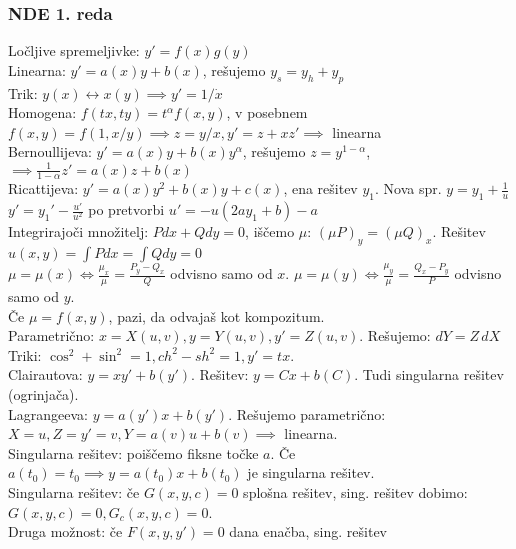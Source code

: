 \documentclass[a4paper,10pt]{article}
\title{\mytitle}
\author{Jure Slak}
\date{\today}
\theoremstyle{definition}
\let\oldint\int
\renewcommand{\int}{\oldint \!}
\begin{document}
\subsubsection*{NDE 1. reda}
Ločljive spremeljivke: $y' = f(x)g(y)$ \\
Linearna: $y' = a(x)y + b(x)$, rešujemo $y_s = y_h + y_p$ \\
Trik: $y(x) \leftrightarrow x(y) \implies y' = 1/\dot{x}$ \\
Homogena: $f(tx, ty) = t^\alpha f(x, y)$, v posebnem $f(x, y) = f(1, x/y)
  \implies z = y/x, y' = z + xz' \implies$ linearna \\
Bernoullijeva: $y' = a(x)y + b(x)y^\alpha$, rešujemo $z = y^{1-\alpha}$,
  $\implies \frac{1}{1-\alpha}z' = a(x)z + b(x)$ \\
Ricattijeva: $y' = a(x)y^2 + b(x)y + c(x)$, ena rešitev $y_1$. Nova spr. $y = y_1 + \frac{1}{u}$\\
$y'=y_1'-\frac{u'}{u^2}$ po pretvorbi $u'=-u(2ay_1+b)-a$
\\
Integrirajoči množitelj: $Pdx + Qdy = 0$, iščemo $\mu$: $(\mu P)_y = (\mu Q)_x$.
Rešitev $u(x, y) = \int Pdx = \int Qdy = 0$ \\
\hspace*{20pt} $\mu = \mu(x) \iff \frac{\mu_x}{\mu} = \frac{P_y - Q_x}{Q}$ odvisno samo od $x$.
               $\mu = \mu(y) \iff \frac{\mu_y}{\mu} = \frac{Q_x - P_y}{P}$ odvisno samo od $y$. \\
\hspace*{20pt} Če $\mu = f(x, y)$, pazi, da odvajaš kot kompozitum.\\
Parametrično: $x = X(u, v), y = Y(u, v), y' = Z(u, v)$. Rešujemo: $dY = Z \, dX$ \\
\hspace*{20pt} Triki: $\cos^2 + \sin^2 = 1, ch^2 - sh^2 = 1, y' = tx.$\\
Clairautova: $y = xy' + b(y')$. Rešitev: $y = C x + b(C)$. Tudi singularna
rešitev (ogrinjača). \\
Lagrangeeva: $y = a(y')x + b(y')$. Rešujemo parametrično: $X = u, Z = y' = v, Y =
a(v)u + b(v) \implies$ linearna. \\
\hspace*{20pt} Singularna rešitev: poiščemo fiksne točke $a$. Če $a(t_0) = t_0 \implies y = a(t_0) x + b(t_0)$ je singularna rešitev.\\
Singularna rešitev: če $G(x, y, c) = 0$ splošna rešitev, sing. rešitev dobimo:
$G(x, y, c) = 0, G_c(x, y, c) = 0$. \\
\hspace*{20pt} Druga možnost: če $F(x, y, y') = 0$ dana enačba, sing. rešitev
\end{document}
